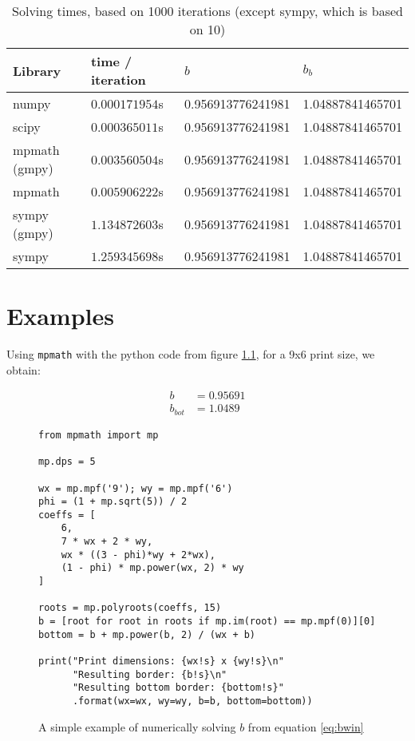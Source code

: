 \documentclass[
    paper=letter,
    parskip=half-,
    DIV=10,
]{scrreprt}
\begin{document}
\begin{table}
\caption{Solving times, based on 1000 iterations (except sympy, which is based on 10)}\label{tbl:times}
\centering
\begin{tabular}{llll}
\hline
Library              & time / iteration  & $b$ & $b_b$ \\
\hline
numpy                & $0.000171954$s    & 0.956913776241981   & 1.04887841465701 \\
scipy                & $0.000365011$s    & 0.956913776241981   & 1.04887841465701 \\
mpmath (gmpy)        & $0.003560504$s    & 0.956913776241981   & 1.04887841465701 \\
mpmath               & $0.005906222$s    & 0.956913776241981   & 1.04887841465701 \\
sympy (gmpy)         & $1.134872603$s    & 0.956913776241981   & 1.04887841465701 \\
sympy                & $1.259345698$s    & 0.956913776241981   & 1.04887841465701 \\
\hline
\end{tabular}
\end{table}


\chapter{Examples}

Using \texttt{mpmath} with the python code from figure \ref{code:solver1}, for a 9x6 print size, we obtain:

    \begin{align*}
        b &= 0.95691 \\
        b_{bot} &= 1.0489
    \end{align*}

\begin{figure}
\label{code:solver1}
\caption{A simple example of numerically solving $b$ from equation \ref{eq:bwin}}
\begin{verbatim}
from mpmath import mp

mp.dps = 5

wx = mp.mpf('9'); wy = mp.mpf('6')
phi = (1 + mp.sqrt(5)) / 2
coeffs = [
    6,
    7 * wx + 2 * wy,
    wx * ((3 - phi)*wy + 2*wx),
    (1 - phi) * mp.power(wx, 2) * wy
]

roots = mp.polyroots(coeffs, 15)
b = [root for root in roots if mp.im(root) == mp.mpf(0)][0]
bottom = b + mp.power(b, 2) / (wx + b)

print("Print dimensions: {wx!s} x {wy!s}\n"
      "Resulting border: {b!s}\n"
      "Resulting bottom border: {bottom!s}"
      .format(wx=wx, wy=wy, b=b, bottom=bottom))
\end{verbatim}
\end{figure}
\end{document}
